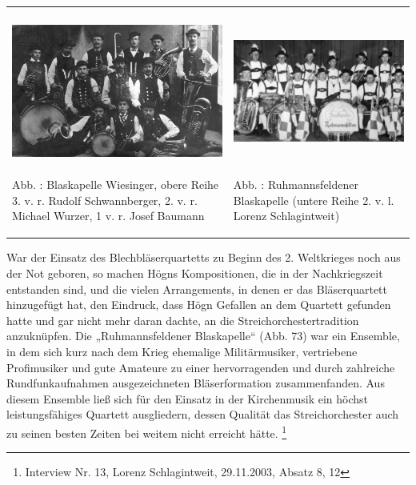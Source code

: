 \documentclass[a4paper]{article}
\newcounter{Abb}
\renewcommand\theAbb{\arabic{Abb}}
\begin{document}
\begin{flushleft}
\tablefirsthead{}
\tablehead{}
\tabletail{}
\tablelasttail{}
\begin{supertabular}{m{7.573cm}m{8.08cm}}

\includegraphics[width=7.391cm,height=4.703cm]{pictures/zulassungsarbeit-img073.jpg}

\label{bkm:Ref100229810}Abb. \stepcounter{Abb}{\theAbb}: Blaskapelle
Wiesinger, obere Reihe 3. v. r. Rudolf Schwannberger, 2. v. r. Michael
Wurzer, 1 v. r. Josef Baumann &

\includegraphics[width=7.897cm,height=4.706cm]{pictures/zulassungsarbeit-img074.jpg}

\label{bkm:Ref100229831}Abb. \stepcounter{Abb}{\theAbb}:
Ruhmannsfeldener Blaskapelle (untere Reihe 2. v. l. Lorenz
Schlagintweit)\\
\end{supertabular}
\end{flushleft}
War der Einsatz des Blechbläserquartetts zu Beginn des 2. Weltkrieges
noch aus der Not geboren, so machen Högns Kompositionen, die in der
Nachkriegszeit entstanden sind, und die vielen Arrangements, in denen
er das Bläserquartett hinzugefügt hat, den Eindruck, dass Högn Gefallen
an dem Quartett gefunden hatte und gar nicht mehr daran dachte, an die
Streichorchestertradition anzuknüpfen. Die „Ruhmannsfeldener
Blaskapelle“ (Abb. 73) war ein Ensemble, in dem sich kurz nach dem
Krieg ehemalige Militärmusiker, vertriebene Profimusiker und gute
Amateure zu einer hervorragenden und durch zahlreiche Rundfunkaufnahmen
ausgezeichneten Bläserformation zusammenfanden. Aus diesem Ensemble
ließ sich für den Einsatz in der Kirchenmusik ein höchst
leistungsfähiges Quartett ausgliedern, dessen Qualität das
Streichorchester auch zu seinen besten Zeiten bei weitem nicht erreicht
hätte. \footnote{Interview Nr. 13, Lorenz Schlagintweit, 29.11.2003,
Absatz 8, 12}
\end{document}
